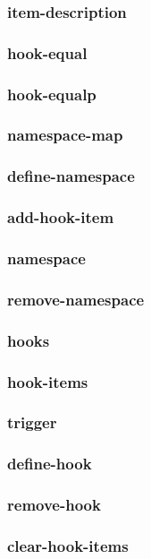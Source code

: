 \subsubsection{item-description}
\subsubsection{hook-equal}
\subsubsection{hook-equalp}
\subsubsection{namespace-map}
\subsubsection{define-namespace}
\subsubsection{add-hook-item}
\subsubsection{namespace}
\subsubsection{remove-namespace}
\subsubsection{hooks}
\subsubsection{hook-items}
\subsubsection{trigger}
\subsubsection{define-hook}
\subsubsection{remove-hook}
\subsubsection{clear-hook-items}
\newpage
